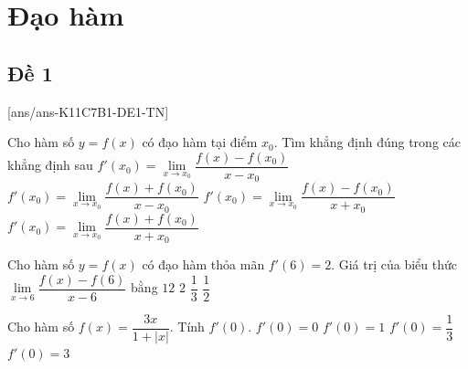 \section{Đạo hàm}

\subsection{Đề 1}
\setcounter{ex}{0}
[ans/ans-K11C7B1-DE1-TN]
\caulc
\begin{ex}%
Cho hàm số $y=f(x)$ có đạo hàm tại điểm $x_0$. Tìm khẳng định đúng trong các khẳng định sau
\choice
{\True $f'\left(x_0\right)=\lim\limits_{x \rightarrow x_0} \dfrac{f(x)-f\left(x_0\right)}{x-x_0}$}
{$f'\left(x_0\right)=\lim\limits_{x \rightarrow x_0} \dfrac{f(x)+f\left(x_0\right)}{x-x_0}$}
{$f'\left(x_0\right)=\lim\limits_{x \rightarrow x_0} \dfrac{f(x)-f\left(x_0\right)}{x+x_0}$}
{$f'\left(x_0\right)=\lim\limits_{x \rightarrow x_0} \dfrac{f(x)+f\left(x_0\right)}{x+x_0}$}
\end{ex}

\begin{ex}%
Cho hàm số $y=f(x)$ có đạo hàm thỏa mãn $f'(6)=2$. Giá trị của biểu thức $\lim\limits_{x \rightarrow 6} \dfrac{f(x)-f(6)}{x-6}$ bằng
\choice
{$ 12 $}
{\True $ 2 $}
{$\dfrac{1}{3}$}
{$\dfrac{1}{2}$}
\end{ex}

\begin{ex}%
Cho hàm số $f(x)=\dfrac{3 x}{1+|x|}$. Tính $f'(0)$.
\choice
{$f'(0)=0$}
{$f'(0)=1$}
{$f'(0)=\dfrac{1}{3}$}
{\True $f'(0)=3$}
\end{ex}

